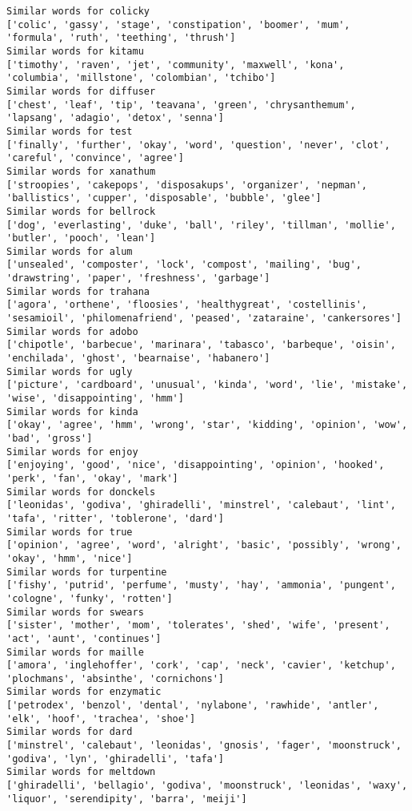 \documentclass[11pt]{article}
\begin{document}
\begin{Verbatim}[commandchars=\\\{\}]
Similar words for colicky
['colic', 'gassy', 'stage', 'constipation', 'boomer', 'mum', 'formula', 'ruth', 'teething', 'thrush']
Similar words for kitamu
['timothy', 'raven', 'jet', 'community', 'maxwell', 'kona', 'columbia', 'millstone', 'colombian', 'tchibo']
Similar words for diffuser
['chest', 'leaf', 'tip', 'teavana', 'green', 'chrysanthemum', 'lapsang', 'adagio', 'detox', 'senna']
Similar words for test
['finally', 'further', 'okay', 'word', 'question', 'never', 'clot', 'careful', 'convince', 'agree']
Similar words for xanathum
['stroopies', 'cakepops', 'disposakups', 'organizer', 'nepman', 'ballistics', 'cupper', 'disposable', 'bubble', 'glee']
Similar words for bellrock
['dog', 'everlasting', 'duke', 'ball', 'riley', 'tillman', 'mollie', 'butler', 'pooch', 'lean']
Similar words for alum
['unsealed', 'composter', 'lock', 'compost', 'mailing', 'bug', 'drawstring', 'paper', 'freshness', 'garbage']
Similar words for trahana
['agora', 'orthene', 'floosies', 'healthygreat', 'costellinis', 'sesamioil', 'philomenafriend', 'peased', 'zataraine', 'cankersores']
Similar words for adobo
['chipotle', 'barbecue', 'marinara', 'tabasco', 'barbeque', 'oisin', 'enchilada', 'ghost', 'bearnaise', 'habanero']
Similar words for ugly
['picture', 'cardboard', 'unusual', 'kinda', 'word', 'lie', 'mistake', 'wise', 'disappointing', 'hmm']
Similar words for kinda
['okay', 'agree', 'hmm', 'wrong', 'star', 'kidding', 'opinion', 'wow', 'bad', 'gross']
Similar words for enjoy
['enjoying', 'good', 'nice', 'disappointing', 'opinion', 'hooked', 'perk', 'fan', 'okay', 'mark']
Similar words for donckels
['leonidas', 'godiva', 'ghiradelli', 'minstrel', 'calebaut', 'lint', 'tafa', 'ritter', 'toblerone', 'dard']
Similar words for true
['opinion', 'agree', 'word', 'alright', 'basic', 'possibly', 'wrong', 'okay', 'hmm', 'nice']
Similar words for turpentine
['fishy', 'putrid', 'perfume', 'musty', 'hay', 'ammonia', 'pungent', 'cologne', 'funky', 'rotten']
Similar words for swears
['sister', 'mother', 'mom', 'tolerates', 'shed', 'wife', 'present', 'act', 'aunt', 'continues']
Similar words for maille
['amora', 'inglehoffer', 'cork', 'cap', 'neck', 'cavier', 'ketchup', 'plochmans', 'absinthe', 'cornichons']
Similar words for enzymatic
['petrodex', 'benzol', 'dental', 'nylabone', 'rawhide', 'antler', 'elk', 'hoof', 'trachea', 'shoe']
Similar words for dard
['minstrel', 'calebaut', 'leonidas', 'gnosis', 'fager', 'moonstruck', 'godiva', 'lyn', 'ghiradelli', 'tafa']
Similar words for meltdown
['ghiradelli', 'bellagio', 'godiva', 'moonstruck', 'leonidas', 'waxy', 'liquor', 'serendipity', 'barra', 'meiji']

\end{Verbatim}
\end{document}
